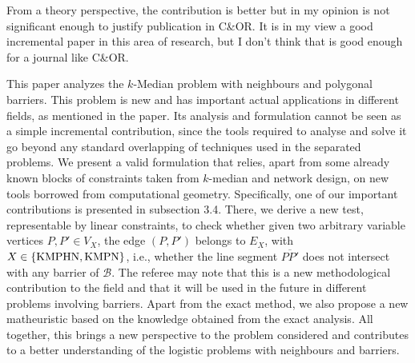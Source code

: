 \documentclass{article}
\newenvironment{reviewer}{\setcounter{pointcounter}{1}}{}
\newcommand{\point}{\text{{\selectfont \thepointcounter} \stepcounter{pointcounter}}}
\newcommand{\JP}[1]{{\color{black}#1}}
\begin{document}
\begin{reviewer}
\begin{tcolorbox}[breakable,enhanced,coltitle=black,colback=red!5!white,colframe=red!75!black,title=\textbf{Answer R1.\point},borderline={1pt}{0pt}{black},boxrule=0pt]
		\end{tcolorbox}
		
		\begin{itshape}
			From a theory perspective, the contribution is better but in my opinion is not significant enough to justify publication in C\&OR. It is in my view a good incremental paper in this area of research, but I don't think that is good enough for a journal like C\&OR.
		\end{itshape}
		
		\begin{tcolorbox}[breakable,enhanced,coltitle=black,colback=red!5!white,colframe=red!75!black,title=\textbf{Answer R1.\point},borderline={1pt}{0pt}{black},boxrule=0pt]
			\JP{ This paper analyzes the $k$-Median  problem with neighbours and polygonal barriers. This problem is new and has important actual applications in different fields, as mentioned in the paper. Its analysis and formulation cannot be seen as a simple incremental contribution, since the tools required to analyse and solve it go beyond any standard overlapping of techniques used in the separated problems. We present a valid formulation that relies, apart from some already known blocks of constraints taken from $k$-median and network design,  on new tools borrowed from computational geometry. Specifically, one of our} \JP{important contributions  is presented in subsection 3.4. There, we derive a new test, representable by linear constraints, to check whether given two arbitrary variable vertices $P, P'\in V_X$, the edge $(P, P')$ belongs to $E_X$, with $X\in\{\rm KMPHN, \rm KMPN\}$, i.e., whether the line segment $\overline{PP'}$ does not intersect with any barrier of $\mathcal B$.  The referee may note that this is a new methodological contribution to the field and that it will be used in the future in different problems involving barriers. Apart from the exact method, we also propose a new matheuristic based on the knowledge obtained from the exact analysis. All together, this brings a new perspective to the problem considered and contributes to a better understanding of the logistic problems with neighbours and barriers. }

		\end{tcolorbox}
		
	\end{reviewer}
	
\end{document}
